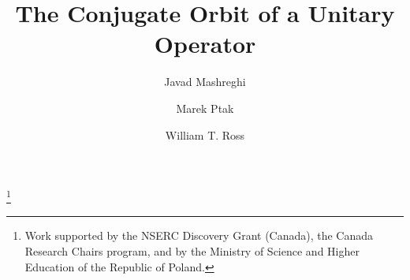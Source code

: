 \documentclass{dis}
\theoremstyle{plain}
\theoremstyle{definition}
\newcommand{\0}{{\color{lightgray}0}}
\begin{document}

\thanks{Work supported by the NSERC Discovery Grant (Canada), the Canada Research Chairs program,  and by the Ministry of Science and
Higher Education of the Republic of Poland.}


\title{The Conjugate Orbit of a Unitary Operator}

\author{Javad Mashreghi}
\address{D\'epartement de Math\'ematiques et de Statistique\\ 
Universit\'e Laval\\ Qu\'ebec, QC
Canada, G1K 0A6\\
E-mail: javad.mashreghi@mat.ulaval.ca}


\author{Marek Ptak}
\address{Department of Applied Mathematics\\
University of Agriculture, ul. Balicka 253c\\ 30-198 Krak\'ow, Poland\\
Email: rmptak@cyf-kr.edu.pl}



\author{William T. Ross}
	\address{Department of Mathematics and Statistics\\
	 University of Richmond\\Richmond, VA 23173, USA\\
	Email: wross@richmond.edu}
	

\maketitledis




\tableofcontents
\end{document}
